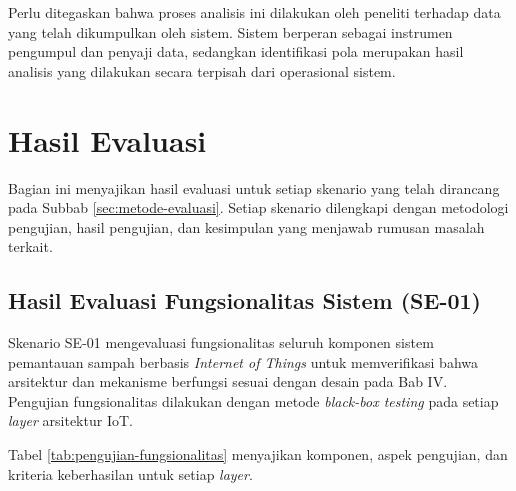 Perlu ditegaskan bahwa proses analisis ini dilakukan oleh peneliti terhadap data yang telah dikumpulkan oleh sistem. Sistem berperan sebagai instrumen pengumpul dan penyaji data, sedangkan identifikasi pola merupakan hasil analisis yang dilakukan secara terpisah dari operasional sistem.

\section{Hasil Evaluasi}
\label{sec:hasil-evaluasi}

Bagian ini menyajikan hasil evaluasi untuk setiap skenario yang telah dirancang pada Subbab \ref{sec:metode-evaluasi}. Setiap skenario dilengkapi dengan metodologi pengujian, hasil pengujian, dan kesimpulan yang menjawab rumusan masalah terkait.

\subsection{Hasil Evaluasi Fungsionalitas Sistem (SE-01)}

Skenario SE-01 mengevaluasi fungsionalitas seluruh komponen sistem pemantauan sampah berbasis \textit{Internet of Things} untuk memverifikasi bahwa arsitektur dan mekanisme berfungsi sesuai dengan desain pada Bab IV. Pengujian fungsionalitas dilakukan dengan metode \textit{black-box testing} pada setiap \textit{layer} arsitektur IoT.

Tabel \ref{tab:pengujian-fungsionalitas} menyajikan komponen, aspek pengujian, dan kriteria keberhasilan untuk setiap \textit{layer}.

